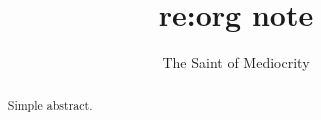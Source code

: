 \documentclass{tufte-handout}
\title{{\bf re:org} note}
\author{The Saint of Mediocrity}
\begin{document}
\maketitle

\begin{abstract}
\noindent
Simple abstract.
\end{abstract}



\end{document}
